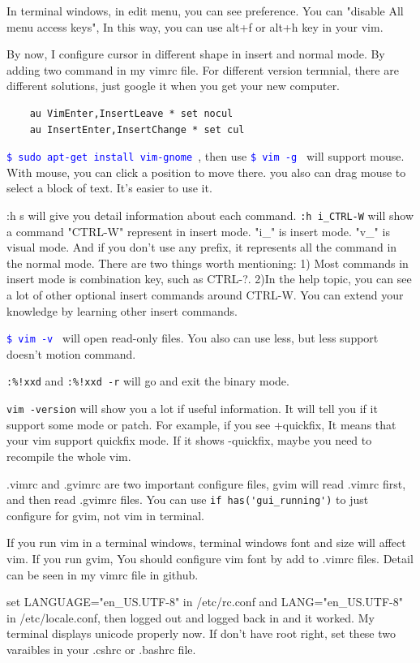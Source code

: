 \documentclass[paper=8.5in:11in, twoside, 12pt, pagesize=pdftex]{book}
\newcommand{\linuxcommand}[1]{\texttt{\textcolor{blue}{\$ #1 \Pisymbol{psy}{191}}}}
\begin{document}
In terminal windows, in edit menu, you can see preference. You can "disable All menu access keys", In this way, you can use alt+f or alt+h key in your vim. 

By now, I configure cursor in different shape in insert and normal mode. By adding two command in my vimrc file. For different version termnial, there are different solutions, just google it when you get your new computer.
\begin{verbatim}
	au VimEnter,InsertLeave * set nocul
	au InsertEnter,InsertChange * set cul
\end{verbatim} 		

\linuxcommand{sudo apt-get install vim-gnome}, then use \linuxcommand{vim -g} will support mouse.  With mouse, you can click a position to move there. you also can drag mouse to select a block of text. It's easier to use it.  

:h s will give you detail information about each command. \verb=:h i_CTRL-W= will show a command "CTRL-W" represent in insert mode. "i\_" is insert mode. "v\_" is visual mode. And if you don't use any prefix, it represents all the command in the normal mode. There are two things worth mentioning: 1) Most commands in insert mode is combination key, such as CTRL-?. 2)In the help topic, you can see a lot of other optional insert commands around CTRL-W. You can extend your knowledge by learning other insert commands.

\linuxcommand{vim -v} will open read-only files. You also can use less, but less support doesn't motion command.

\verb=:%!xxd= and \verb=:%!xxd -r= will go and exit the binary mode.

\verb=vim -version= will show you a lot if useful information. It will tell you if it support some mode or patch. For example, if you see +quickfix, It means that your vim support quickfix mode. If it shows -quickfix, maybe you need to recompile the whole vim.

.vimrc and .gvimrc are two important configure files, gvim  will read .vimrc first, and then read .gvimrc files.  You can use \verb=if has('gui_running')= to just configure for gvim, not vim in terminal. 

If you run vim in a terminal windows, terminal windows font and size will affect vim.  If you run gvim, You should configure vim font by add to .vimrc files. Detail can be seen in my vimrc file in github.

set LANGUAGE="en\_US.UTF-8" in /etc/rc.conf and LANG="en\_US.UTF-8" in /etc/locale.conf, then logged out and logged back in and it worked. My terminal displays unicode properly now. If don't have root right, set these two varaibles in your .cshrc or .bashrc file.
\end{document}
